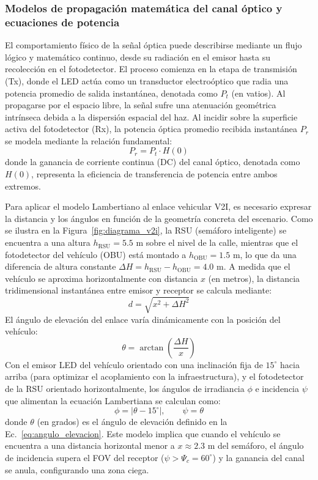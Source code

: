 \subsubsection{Modelos de propagación matemática del canal óptico y ecuaciones de potencia}
El comportamiento físico de la señal óptica puede describirse mediante un flujo lógico y matemático continuo, desde su radiación en el emisor hasta su recolección en el fotodetector. El proceso comienza en la etapa de transmisión (Tx), donde el LED actúa como un transductor electroóptico que radia una potencia promedio de salida instantánea, denotada como $P_t$ (en vatios). Al propagarse por el espacio libre, la señal sufre una atenuación geométrica intrínseca debida a la dispersión espacial del haz. Al incidir sobre la superficie activa del fotodetector (Rx), la potencia óptica promedio recibida instantánea $P_r$ se modela mediante la relación fundamental:
\begin{equation}
	P_r = P_t \cdot H(0)
	\label{eq:pr_optica}
\end{equation}
donde la ganancia de corriente continua (DC) del canal óptico, denotada como $H(0)$, representa la eficiencia de transferencia de potencia entre ambos extremos.



Para aplicar el modelo Lambertiano al enlace vehicular V2I, es necesario expresar la distancia y los ángulos en función de la geometría concreta del escenario. Como se ilustra en la Figura~\ref{fig:diagrama_v2i}, la RSU (semáforo inteligente) se encuentra a una altura $h_{\text{RSU}} = 5.5\text{ m}$ sobre el nivel de la calle, mientras que el fotodetector del vehículo (OBU) está montado a $h_{\text{OBU}} = 1.5\text{ m}$, lo que da una diferencia de altura constante $\Delta H = h_{\text{RSU}} - h_{\text{OBU}} = 4.0\text{ m}$. A medida que el vehículo se aproxima horizontalmente con distancia $x$ (en metros), la distancia tridimensional instantánea entre emisor y receptor se calcula mediante:
\begin{equation}
	d = \sqrt{x^2 + \Delta H^2}
	\label{eq:distancia_v2i}
\end{equation}
El ángulo de elevación del enlace varía dinámicamente con la posición del vehículo:
\begin{equation}
	\theta = \arctan\!\left(\frac{\Delta H}{x}\right)
	\label{eq:angulo_elevacion}
\end{equation}
Con el emisor LED del vehículo orientado con una inclinación fija de $15^\circ$ hacia arriba (para optimizar el acoplamiento con la infraestructura), y el fotodetector de la RSU orientado horizontalmente, los ángulos de irradiancia $\phi$ e incidencia $\psi$ que alimentan la ecuación Lambertiana se calculan como:
\begin{equation}
	\phi = |\theta - 15^\circ|, \qquad \psi = \theta
	\label{eq:angulos_v2i}
\end{equation}
donde $\theta$ (en grados) es el ángulo de elevación definido en la Ec.~\ref{eq:angulo_elevacion}. Este modelo implica que cuando el vehículo se encuentra a una distancia horizontal menor a $x \approx 2.3\text{ m}$ del semáforo, el ángulo de incidencia supera el FOV del receptor ($\psi > \Psi_c = 60^\circ$) y la ganancia del canal se anula, configurando una zona ciega.

